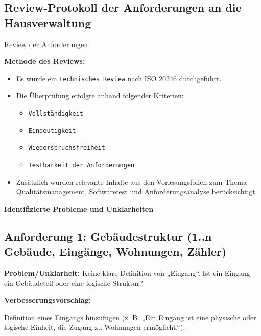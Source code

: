 \subsection{Review-Protokoll der Anforderungen an die Hausverwaltung}

Review der Anforderungen


\textbf{Methode des Reviews:}
\begin{itemize}[noitemsep, topsep=0pt, parsep=0pt, partopsep=0pt]
	\item Es wurde ein \texttt{technisches Review} nach ISO 20246 durchgeführt.
	\item Die Überprüfung erfolgte anhand folgender Kriterien:
	\begin{itemize}[noitemsep, topsep=0pt, parsep=0pt, partopsep=0pt]
		\item \texttt{Vollständigkeit}
		\item \texttt{Eindeutigkeit}
		\item \texttt{Wiederspruchsfreiheit}
		\item \texttt{Testbarkeit der Anforderungen}
	\end{itemize}
	\item Zusätzlich wurden relevante Inhalte aus den Vorlesungsfolien zum Thema Qualitätsmanagement, Softwaretest und Anforderungsanalyse berücksichtigt.
\end{itemize}

\textbf{Identifizierte Probleme und Unklarheiten}

\newcommand{\anforderung}[3]{%
    \subsection*{Anforderung #1: #2}
    \textbf{Problem/Unklarheit:} #3
    
    \vspace{0.3cm}
    \textbf{Verbesserungsvorschlag:}
}

\anforderung{1}{Gebäudestruktur (1..n Gebäude, Eingänge, Wohnungen, Zähler)}
{Keine klare Definition von „Eingang“. Ist ein Eingang ein Gebäudeteil oder eine logische Struktur?}
{Definition eines Eingangs hinzufügen (z. B. „Ein Eingang ist eine physische oder logische Einheit, die Zugang zu Wohnungen ermöglicht.“).}

